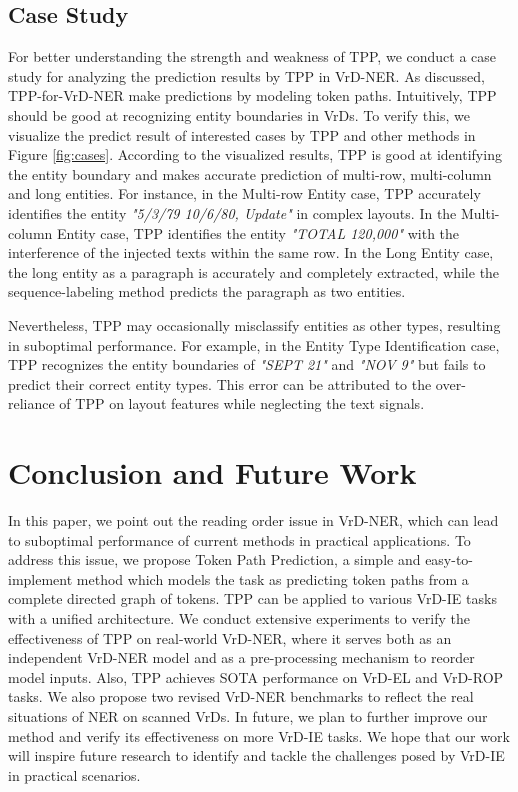 \documentclass[11pt]{article}
\begin{document}
\subsection{Case Study}
For better understanding the strength and weakness of TPP, we conduct a case study for analyzing the prediction results by TPP in VrD-NER. 
As discussed, TPP-for-VrD-NER make predictions by modeling token paths. 
Intuitively, TPP should be good at recognizing entity boundaries in VrDs. 
To verify this, we visualize the predict result of interested cases by TPP and other methods in Figure \ref{fig:cases}. 
According to the visualized results, TPP is good at identifying the entity boundary and makes accurate prediction of multi-row, multi-column and long entities. 
For instance, in the Multi-row Entity case, TPP accurately identifies the entity {\footnotesize \textit{"5/3/79 10/6/80, Update"}} in complex layouts. 
In the Multi-column Entity case, TPP identifies the entity {\footnotesize \textit{"TOTAL 120,000"}} with the interference of the injected texts within the same row.
In the Long Entity case, the long entity as a paragraph is accurately and completely extracted, while the sequence-labeling method predicts the paragraph as two entities.

Nevertheless, TPP may occasionally misclassify entities as other types, resulting in suboptimal performance.
For example, in the Entity Type Identification case, TPP recognizes the entity boundaries of {\footnotesize \textit{"SEPT 21"}} and {\footnotesize \textit{"NOV 9"}} but fails to predict their correct entity types. 
This error can be attributed to the over-reliance of TPP on layout features while neglecting the text signals.

\section{Conclusion and Future Work}

In this paper, we point out the reading order issue in VrD-NER, which can lead to suboptimal performance of current methods in practical applications. 
To address this issue, we propose Token Path Prediction, a simple and easy-to-implement method which models the task as predicting token paths from a complete directed graph of tokens. 
TPP can be applied to various VrD-IE tasks with a unified architecture. 
We conduct extensive experiments to verify the effectiveness of TPP on real-world VrD-NER, where it serves both as an independent VrD-NER model and as a pre-processing mechanism to reorder model inputs. 
Also, TPP achieves SOTA performance on VrD-EL and VrD-ROP tasks. 
We also propose two revised VrD-NER benchmarks to reflect the real situations of NER on scanned VrDs.
In future, we plan to further improve our method and verify its effectiveness on more VrD-IE tasks. 
We hope that our work will inspire future research to identify and tackle the challenges posed by VrD-IE in practical scenarios.
\end{document}
